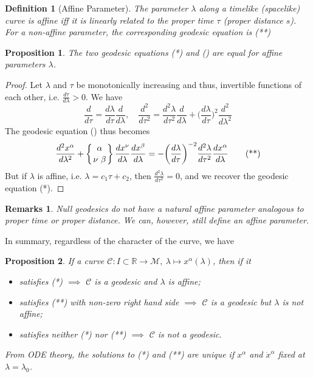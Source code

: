 \documentclass[a4paper]{article}
\newtheorem{remarks}{Remarks}[section]
\theoremstyle{new}
\newtheorem{defi}{Definition}[section]
\newtheorem{prop}{Proposition}[section]
\begin{document}
\begin{defi}[Affine Parameter]
The parameter $\lambda$ along a timelike (spacelike) curve is affine iff it is linearly related to the proper time $\tau$ (proper distance $s$). For a non-affine parameter, the corresponding geodesic equation is (**)
\end{defi}
\begin{prop}
The two geodesic equations (*) and (\dag) are equal for affine parameters $\lambda$.
\end{prop}
\begin{proof}
Let $\lambda$ and $\tau$ be monotonically increasing and thus, invertible functions of each other, i.e. $\frac{d\tau}{d\lambda}>0$. We have
$$\frac{d}{d\tau}=\frac{d\lambda}{d\tau}\frac{d}{d\lambda},\quad\frac{d^2}{d\tau^2}=\frac{d^2\lambda}{d\tau^2}\frac{d}{d\lambda}+\bigg(\frac{d\lambda}{d\tau}\bigg)^2\frac{d^2}{d\lambda^2}$$
The geodesic equation (\dag) thus becomes
\begin{equation}
\frac{d^2x^\alpha}{d\lambda^2}+\left \{ {\alpha \atop
\nu\ \beta}\right\}\frac{dx^\nu}{d\lambda}\frac{dx^\beta}{d\lambda}=-\bigg(\frac{d\lambda}{d\tau}\bigg)^{-2}\frac{d^2\lambda}{d\tau^2}\frac{dx^\alpha}{d\lambda}\tag{**}
\end{equation}
But if $\lambda$ is affine, i.e. $\lambda=c_1\tau+c_2$, then $\frac{d^2\lambda}{d\tau^2}=0$, and we recover the geodesic equation (*).
\end{proof}
\begin{remarks}
Null geodesics do not have a natural affine parameter analogous to proper time or proper distance. We can, however, still define an affine parameter.
\end{remarks}
In summary, regardless of the character of the curve, we have
\begin{prop}
If a curve $\mathcal{C}:I\subset\mathbb{R}\rightarrow\mathcal{M},~\lambda\mapsto x^\alpha(\lambda)$, then if it
\begin{itemize}
    \item satisfies (*) $\implies$ $\mathcal{C}$ is a geodesic and $\lambda$ is affine;
    \item satisfies (**) with non-zero right hand side $\implies$ $\mathcal{C}$ is a geodesic but $\lambda$ is not affine;
    \item satisfies neither (*) nor (**) $\implies$ $\mathcal{C}$ is not a geodesic.
\end{itemize}
From ODE theory, the solutions to (*) and (**) are unique if $x^\alpha$ and $\dot{x}^\alpha$ fixed at $\lambda=\lambda_0$.
\end{prop}
\end{document}
